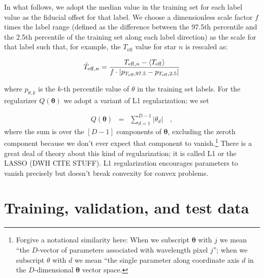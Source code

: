 \documentclass[12pt,preprint]{aastex}
\newcommand{\Teff}{T_{\mathrm{eff}}}
\newcommand{\Dvector}[1]{\boldsymbol{#1}}
\newcommand{\vectheta}{\Dvector{\theta}}
\begin{document}
In what follows, we adopt the median value in the training set for each label 
value as the fiducial offset for that label.  We choose a dimensionless scale
factor $f$ times the label range (defined as the difference between the 97.5th
percentile and the 2.5th percentile of the training set along each label 
direction) as the scale for that label such that, for example, the $\Teff$ 
value for star $n$ is rescaled as:

\begin{eqnarray}\label{eq:label-norm}
  \hat{T}_{\mathrm{eff},n} = \frac{T_{{\rm eff},n} - \langle\Teff\rangle}{f\cdot|p_{\Teff,97.5} - p_{\Teff,2.5}|}
\end{eqnarray}

\noindent{}where $p_{\theta,k}$ is the $k$-th percentile value of $\theta$ in
the training set labels. For the regularizer $Q(\vectheta)$ we adopt a variant
of L1 regularization; we set

\begin{eqnarray}\label{eq:l1-variant}
  Q(\vectheta) &=& \sum_{d=1}^{D-1} |\theta_d|
  \quad,
\end{eqnarray}
where the sum is over the $[D-1]$ components of $\vectheta$, excluding the 
zeroth component because we don't ever expect that component to vanish.\footnote{Forgive a notational similarity here: When we subscript $\vectheta$ with $j$ we
mean ``the $D$-vector of parameters associated with wavelength pixel $j$''; when
we subscript $\theta$ with $d$ we mean ``the single parameter along coordinate
axis $d$ in the $D$-dimensional $\vectheta$ vector space.}  There is a great 
deal of theory about this kind of regularization; it is called L1 or the LASSO
(DWH CITE STUFF).  
L1 regularization encourages parameters to vanish precisely but
doesn't break convexity for convex problems.






\section{Training, validation, and test data}
\end{document}
